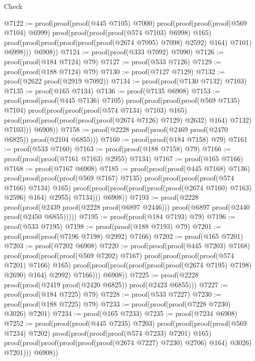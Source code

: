\begin{lexlean}{Check}
\begin{coremodule}
@7122 := proof(proof(proof(@445 @7105) @7000)
      proof(proof(proof(proof(@569 @7104) @6999)
            proof(proof(proof(proof(@574 @7103) @6998) @165)
                proof(proof(proof(proof(proof(proof(@2674 @7095) @7098) @2592) @164) @7101) @6998)))
          @6908))
@7124 := proof(proof(@333 @7092) @7090)
@7126 := proof(proof(@184 @7124) @79)
@7127 := proof(@533 @7126)
@7129 := proof(proof(@188 @7124) @79)
@7130 := proof(@7127 @7129)
@7132 := proof(@2622 proof(@2919 @7092))
@7134 := proof(proof(@7130 @7132) @7103)
@7135 := proof(@165 @7134)
@7136 := proof(@7135 @6908)
@7153 := proof(proof(proof(@445 @7136) @7105)
      proof(proof(proof(proof(@569 @7135) @7104)
            proof(proof(proof(proof(@574 @7134) @7103) @165)
                proof(proof(proof(proof(proof(proof(@2674 @7126) @7129) @2632) @164) @7132) @7103)))
          @6908))
@7158 := proof(@2228 proof(proof(@2469 proof(@2470 @6825)) proof(@2104 @6855)))
@7160 := proof(proof(@184 @7158) @79)
@7161 := proof(@533 @7160)
@7163 := proof(proof(@188 @7158) @79)
@7166 := proof(proof(proof(@7161 @7163) @2955) @7134)
@7167 := proof(@165 @7166)
@7168 := proof(@7167 @6908)
@7185 := proof(proof(proof(@445 @7168) @7136)
      proof(proof(proof(proof(@569 @7167) @7135)
            proof(proof(proof(proof(@574 @7166) @7134) @165)
                proof(proof(proof(proof(proof(proof(@2674 @7160) @7163) @2596) @164) @2955) @7134)))
          @6908))
@7193 := proof(@2228
      proof(proof(@2439 proof(@2228 proof(@6897 @2446)))
          proof(@6897 proof(@2440 proof(@2450 @6855)))))
@7195 := proof(proof(@184 @7193) @79)
@7196 := proof(@533 @7195)
@7198 := proof(proof(@188 @7193) @79)
@7201 := proof(proof(proof(@7196 @7198) @2992) @7166)
@7202 := proof(@165 @7201)
@7203 := proof(@7202 @6908)
@7220 := proof(proof(proof(@445 @7203) @7168)
      proof(proof(proof(proof(@569 @7202) @7167)
            proof(proof(proof(proof(@574 @7201) @7166) @165)
                proof(proof(proof(proof(proof(proof(@2674 @7195) @7198) @2690) @164) @2992) @7166)))
          @6908))
@7225 := proof(@2228 proof(proof(@2419 proof(@2420 @6825)) proof(@2423 @6855)))
@7227 := proof(proof(@184 @7225) @79)
@7228 := proof(@533 @7227)
@7230 := proof(proof(@188 @7225) @79)
@7233 := proof(proof(proof(@7228 @7230) @3026) @7201)
@7234 := proof(@165 @7233)
@7235 := proof(@7234 @6908)
@7252 := proof(proof(proof(@445 @7235) @7203)
      proof(proof(proof(proof(@569 @7234) @7202)
            proof(proof(proof(proof(@574 @7233) @7201) @165)
                proof(proof(proof(proof(proof(proof(@2674 @7227) @7230) @2706) @164) @3026) @7201)))
          @6908))

\end{coremodule}
\end{lexlean}
